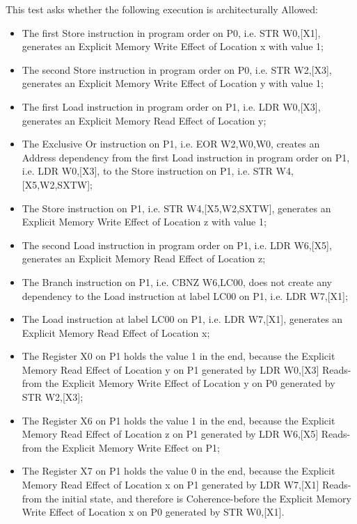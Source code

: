 This test asks whether the following execution is architecturally Allowed:

\begin{itemize}
  \item The first Store instruction in program order on P0, i.e. STR W0,[X1], generates an Explicit Memory Write Effect of Location x with value 1;
  \item The second Store instruction in program order on P0, i.e. STR W2,[X3], generates an Explicit Memory Write Effect of Location y with value 1;
  \item The first Load instruction in program order on P1, i.e. LDR W0,[X3], generates an Explicit Memory Read Effect of Location y;
  \item The Exclusive Or instruction on P1, i.e. EOR W2,W0,W0, creates an Address dependency from the first Load instruction in program order on P1, i.e. LDR W0,[X3], to the Store instruction on P1, i.e. STR W4,[X5,W2,SXTW];
  \item The Store instruction on P1, i.e. STR W4,[X5,W2,SXTW], generates an Explicit Memory Write Effect of Location z with value 1;
  \item The second Load instruction in program order on P1, i.e. LDR W6,[X5], generates an Explicit Memory Read Effect of Location z;
  \item The Branch instruction on P1, i.e. CBNZ W6,LC00, does not create any dependency to the Load instruction at label LC00 on P1, i.e. LDR W7,[X1];
  \item The Load instruction at label LC00 on P1, i.e. LDR W7,[X1], generates an Explicit Memory Read Effect of Location x;
  \item The Register X0 on P1 holds the value 1 in the end, because the Explicit Memory Read Effect of Location y on P1 generated by LDR W0,[X3] Reads-from the Explicit Memory Write Effect of Location y on P0 generated by STR W2,[X3];
  \item The Register X6 on P1 holds the value 1 in the end, because the Explicit Memory Read Effect of Location z on P1 generated by LDR W6,[X5] Reads-from the Explicit Memory Write Effect on P1;
  \item The Register X7 on P1 holds the value 0 in the end, because the Explicit Memory Read Effect of Location x on P1 generated by LDR W7,[X1] Reads-from the initial state, and therefore is Coherence-before the Explicit Memory Write Effect of Location x on P0 generated by STR W0,[X1].
\end{itemize}
